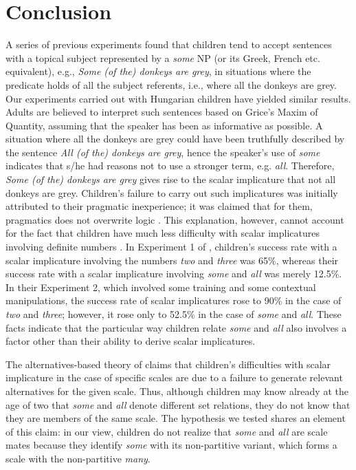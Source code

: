 \documentclass[output=paper]{langscibook}
\begin{document}
\section{Conclusion}\label{kis-zet:sec:conclusion}\largerpage

A series of previous experiments \citep[e.g.][]{noveck2001children,papafragou2003scalar,miller2005young,papafragouskordos16,pouscoulous2007developmental} found that children tend to accept sentences with a topical subject represented by a \textit{some} NP (or its Greek, French etc. equivalent), e.g., \textit{Some (of the) donkeys are grey}, in situations where the predicate holds of all the subject referents, i.e., where all the donkeys are grey. Our experiments carried out with Hungarian children have yielded similar results. Adults are believed to interpret such sentences based on Grice's Maxim of Quantity, assuming that the speaker has been as informative as possible. A situation where all the donkeys are grey could have been truthfully described by the sentence \textit{All (of the) donkeys are grey}, hence the speaker's use of \textit{some} indicates that s/he had reasons not to use a stronger term, e.g. \textit{all}. Therefore, \textit{Some (of the) donkeys are grey} gives rise to the scalar implicature that not all donkeys are grey. Children's failure to carry out such implicatures was initially attributed to their pragmatic inexperience; it was claimed that for them, pragmatics does not overwrite logic \citep{noveck2001children}. This explanation, however, cannot account for the fact that children have much less difficulty with scalar implicatures involving definite numbers \citep[cf. e.g.,][]{papafragou2003scalar,ekisszt18}. In Experiment 1 of \citet{papafragou2003scalar}, children’s success rate with a scalar implicature involving the numbers \textit{two} and \textit{three} was 65\%, whereas their success rate with a scalar implicature involving \textit{some} and \textit{all} was merely 12.5\%. In their Experiment 2, which involved some training and some contextual manipulations, the success rate of scalar implicatures rose to 90\% in the case of \textit{two} and \textit{three}; however, it rose only to 52.5\% in the case of \textit{some} and \textit{all}. These facts indicate that the particular way children relate \textit{some} and \textit{all} also involves a factor other than their ability to derive scalar implicatures.

The alternatives-based theory of \citet{barner2011accessing} claims that children’s difficulties with scalar implicature in the case of specific scales are due to a failure to generate relevant alternatives for the given scale. Thus, although children may know already at the age of two that \textit{some} and \textit{all} denote different set relations, they do not know that they are members of the same scale. The hypothesis we tested shares an element of this claim: in our view, children do not realize that \textit{some} and \textit{all} are scale mates because they identify \textit{some} with its non-partitive variant, which forms a scale with the non-partitive \textit{many}. 
\end{document}
